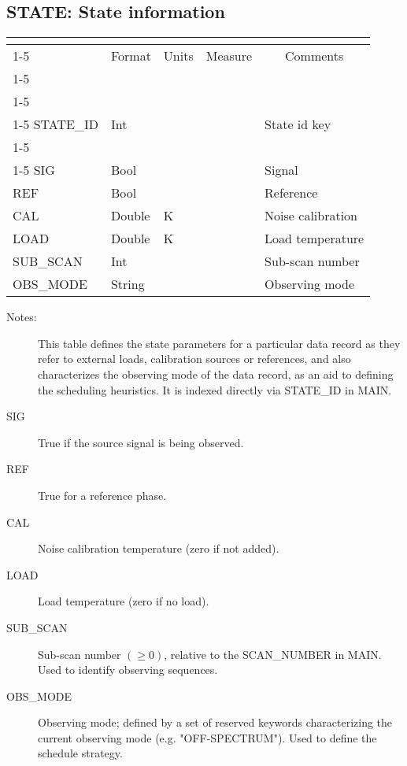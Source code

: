 \documentclass{article}
\newcommand{\defline}[1]{\cline{1-5}
\multicolumn{5}{|l|}{#1} \\
\cline{1-5}}
\newcommand{\definetable}[3][]
{
  \vfill\newpage
  \subsection{#2}
  \label{tbl:#1}
  \vspace{0.15in}
  \small
  \begin{tabular}{|l|p{1.25in}|l|p{.9in}|p{1.4in}|}
  \hline
  \multicolumn{5}{|c|}{\bf #1}\\
  \cline{1-5}
  \multicolumn{1}{|c|}{Name}&\multicolumn{1}{|c|}{Format}&
  \multicolumn{1}{|c|}{Units}&\multicolumn{1}{|c|}{Measure}&
  \multicolumn{1}{|c|}{Comments}\\
  \cline{1-5}
  #3
  \hline
  \end{tabular}
}
\begin{document}
\definetable{STATE: State information}{
\defline{\bf Columns}
\defline{\em Key}
STATE\_ID   &     Int  &           &        & State id key \\
\defline{\em Data}
SIG   &     Bool  &           &        & Signal \\
REF   &     Bool  &           &        & Reference \\
CAL   &     Double &   K      &        & Noise calibration \\
LOAD  &     Double &   K      &        & Load temperature\\
SUB\_SCAN &  Int   &          &        & Sub-scan number\\
OBS\_MODE &  String &         &        & Observing mode\\
}
\begin{description}

\item[Notes:] This table defines the state parameters for a particular
data record as they refer to external loads, calibration sources or
references, and also characterizes the observing mode of the data
record, as an aid to defining the scheduling heuristics. It is indexed
directly via STATE\_ID in MAIN.

\item[SIG] True if the source signal is being observed.

\item[REF] True for a reference phase.

\item[CAL] Noise calibration temperature (zero if not added).

\item[LOAD] Load temperature (zero if no load).

\item[SUB\_SCAN] Sub-scan number $(\geq 0)$, relative to the
SCAN\_NUMBER in MAIN. Used to identify observing sequences.

\item[OBS\_MODE] Observing mode; defined by a set of reserved keywords
characterizing the current observing mode (e.g. "OFF-SPECTRUM"). Used
to define the schedule strategy.

\end{description}
\end{document}
